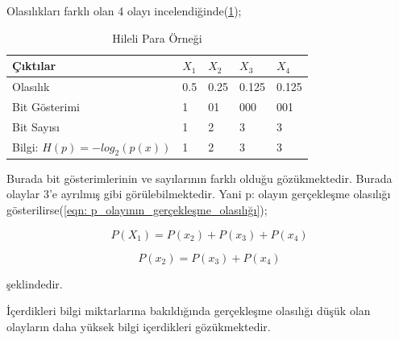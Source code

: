 \documentclass[12pt, a4paper]{article}
\begin{document}
			Olasılıkları farklı olan 4 olayı incelendiğinde(\ref{tab:Tablo4});
			\begin{table}[!ht]
				\begin {center}
				\caption{Hileli Para Örneği \cite{entropi}}	\label{tab:Tablo4}
				\begin{tabular}{|l|l|l|l|l|}
					\hline
					Çıktılar & $X_1$ & $X_2$ & $X_3$ & $X_4$ \\
					\hline
					Olasılık & 0.5 & 0.25 & 0.125 & 0.125\\
					\hline
					Bit Gösterimi & 1 & 01 & 000 & 001 \\
					\hline
					Bit Sayısı & 1 & 2 & 3 & 3  \\
					\hline
					Bilgi: $H(p)= -log_2(p(x))$	& 1 & 2 & 3 & 3 \\
					\hline
				\end{tabular}
				\end {center}
			\end{table}
			\newline
				\vspace*{5\baselineskip}
			Burada bit gösterimlerinin ve sayılarının farklı olduğu gözükmektedir. Burada olaylar 3’e ayrılmış gibi görülebilmektedir. Yani p: olayın gerçekleşme olasılığı gösterilirse(\ref{eqn: p_olayının_gerçekleşme_olasılığı});
			
			\begin{equation}[!hb]
				P(X_1) = P(x_2) + P(x_3) + P(x_4)
			\end{equation}
			
			\begin{equation}[!ht]
				P(x_2) = P(x_3) + P(x_4)
				\label{eqn: p_olayının_gerçekleşme_olasılığı}
			\end{equation}
		
			şeklindedir. 
				
			İçerdikleri bilgi miktarlarına bakıldığında gerçekleşme olasılığı düşük olan olayların daha yüksek bilgi içerdikleri gözükmektedir.
			
\end{document}
